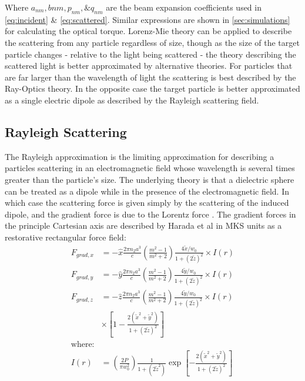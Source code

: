 Where $a_{nm}, b{nm}, p_{nm}, \& q_{nm}$ are the beam expansion 
coefficients used in \eqref{eq:incident} \& \eqref{eq:scattered}.
Similar expressions are shown in \ref{sec:simulations} for 
calculating the optical torque. Lorenz-Mie theory can be applied 
to describe the scattering from any particle regardless of size, 
though as the size of the target particle changes - relative to 
the light being scattered - the theory describing the scattered 
light is better approximated by alternative theories. For 
particles that are far larger than the wavelength of light the 
scattering is best described by the Ray-Optics theory. In the 
opposite case the target particle is better approximated as a 
single electric dipole as described by the Rayleigh scattering 
field.  

\subsection{Rayleigh Scattering}

The Rayleigh approximation is the limiting approximation for 
describing a particles scattering in an electromagnetic field 
whose wavelength is several times greater than the particle's 
size. The underlying theory is that a dielectric sphere can be 
treated as a dipole while in the presence of the electromagnetic 
field. In which case the scattering force is given simply by the 
scattering of the induced dipole, and the gradient force is due 
to the Lorentz force \cite{Gordon1973}. The gradient forces in the 
principle Cartesian axis are described by Harada et al 
\cite{YasuhiroHarada1996} in MKS units as a restorative rectangular 
force field:
\begin{align}
  F_{grad,x}
  &=-\hat{x} \frac{2\pi n_2 a^3}{c}
    \left(\frac{m^2-1}{m^2+2}\right) \frac{4\tilde{x}/w_0}{1+(2\tilde{z})^2} \times I(r)
  \\
  F_{grad,y}
  &=-\hat{y} \frac{2\pi n_2 a^3}{c}
    \left(\frac{m^2-1}{m^2+2}\right) \frac{4\tilde{y}/w_0}{1+(2\tilde{z})^2} \times I(r)
  \\
  F_{grad,z}
  &=-\hat{z} \frac{2\pi n_2 a^3}{c}
    \left(\frac{m^2-1}{m^2+2}\right) \frac{4\tilde{y}/w_0}{1+(2\tilde{z})^2}
    \nonumber \times I(r)
  \\ 
  & \times \left[1-\frac{2(\tilde{x}^2+\tilde{y}^2)}{1+(2\tilde{z})^2} \right]
  \\
  \text{where:}
  \nonumber
  \\
	I(r) &= \left(\frac{2P}{\pi w_0^2}\right) \frac{1}{1+(2\tilde{z}^2)} 
	\exp \left[ - \frac{2(\tilde{x}^2+\tilde{y}^2)}{1+(2\tilde{z})^2} \right]
\end{align}

